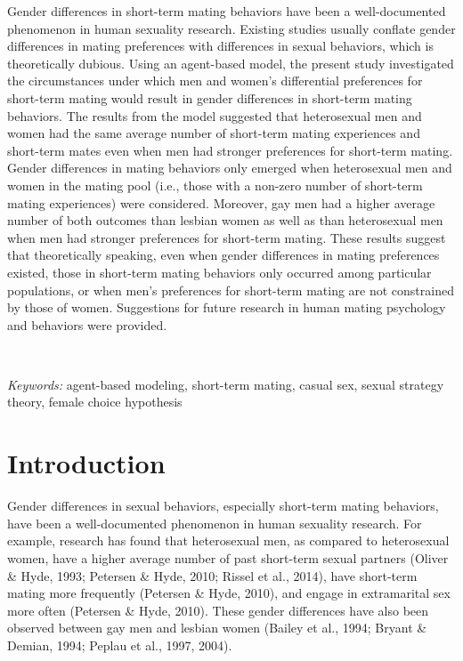 \documentclass[
  11pt,
]{article}
\begin{document}
Gender differences in short-term mating behaviors have been a
well-documented phenomenon in human sexuality research. Existing studies
usually conflate gender differences in mating preferences with
differences in sexual behaviors, which is theoretically dubious. Using
an agent-based model, the present study investigated the circumstances
under which men and women's differential preferences for short-term
mating would result in gender differences in short-term mating
behaviors. The results from the model suggested that heterosexual men
and women had the same average number of short-term mating experiences
and short-term mates even when men had stronger preferences for
short-term mating. Gender differences in mating behaviors only emerged
when heterosexual men and women in the mating pool (i.e., those with a
non-zero number of short-term mating experiences) were considered.
Moreover, gay men had a higher average number of both outcomes than
lesbian women as well as than heterosexual men when men had stronger
preferences for short-term mating. These results suggest that
theoretically speaking, even when gender differences in mating
preferences existed, those in short-term mating behaviors only occurred
among particular populations, or when men's preferences for short-term
mating are not constrained by those of women. Suggestions for future
research in human mating psychology and behaviors were provided.

~

\emph{Keywords:} agent-based modeling, short-term mating, casual sex,
sexual strategy theory, female choice hypothesis

\newpage

\hypertarget{introduction}{%
\section{Introduction}\label{introduction}}

Gender differences in sexual behaviors, especially short-term mating
behaviors, have been a well-documented phenomenon in human sexuality
research. For example, research has found that heterosexual men, as
compared to heterosexual women, have a higher average number of past
short-term sexual partners (Oliver \& Hyde, 1993; Petersen \& Hyde,
2010; Rissel et al., 2014), have short-term mating more frequently
(Petersen \& Hyde, 2010), and engage in extramarital sex more often
(Petersen \& Hyde, 2010). These gender differences have also been
observed between gay men and lesbian women (Bailey et al., 1994; Bryant
\& Demian, 1994; Peplau et al., 1997, 2004).
\end{document}
